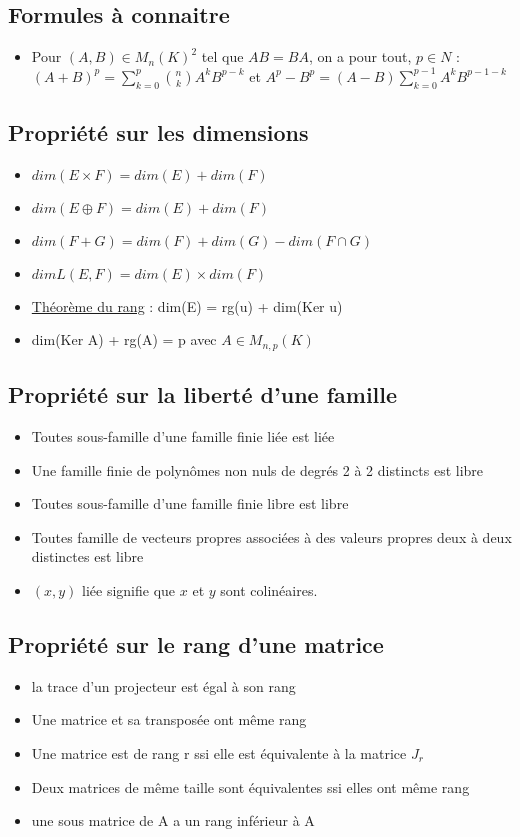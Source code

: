 \documentclass{article}
\begin{document}
\subsection{Formules à connaitre}
\begin{itemize}[label=$\ast$]
	\item Pour \( (A,B) \in M_n(K)^2 \) tel que \(AB = BA\), on a pour tout, \(p \in N\) : \((A+B)^p = \sum_{k=0}^{p} \binom{n}{k} A^k B^{p-k} \) et \(A^p - B^p = (A-B) \sum_{k = 0}^{p-1}A^kB^{p-1-k}\)
\end{itemize}

\subsection{Propriété sur les dimensions}
\begin{itemize}[label=$\ast$]
	\item \( dim(E \times F) = dim(E) + dim(F) \)
	\item \( dim(E \oplus F) = dim(E) + dim(F) \)
	\item \( dim(F + G) = dim(F) + dim(G) - dim(F \cap G) \)
	\item \(dim L(E,F) = dim(E) \times dim(F) \)
	\item \underline{Théorème du rang} : dim(E)  = rg(u) + dim(Ker u)
	\item dim(Ker A) + rg(A) = p avec \(A \in M_{n,p}(K)\)
\end{itemize}

\subsection{Propriété sur la liberté d'une famille}
\begin{itemize}[label=$\ast$]
	\item Toutes sous-famille d'une famille finie liée est liée
	\item Une famille finie de polynômes non nuls de degrés 2 à 2 distincts est libre
	\item Toutes sous-famille d'une famille finie libre est libre
	\item  Toutes famille de vecteurs propres associées à des valeurs propres deux à deux distinctes est libre
	\item \( (x,y) \) liée signifie que \( x \) et \( y \) sont colinéaires.
\end{itemize}

\subsection{Propriété sur le rang d'une matrice}
\begin{itemize}[label=$\ast$]
	\item la trace d'un projecteur est égal à son rang
	\item Une matrice et sa transposée ont même rang
	\item Une matrice est de rang r ssi elle est équivalente à la matrice \( J_r \)
	\item Deux matrices de même taille sont équivalentes ssi elles ont même rang
	\item une sous matrice de A a un rang inférieur à A
\end{itemize}
\end{document}
